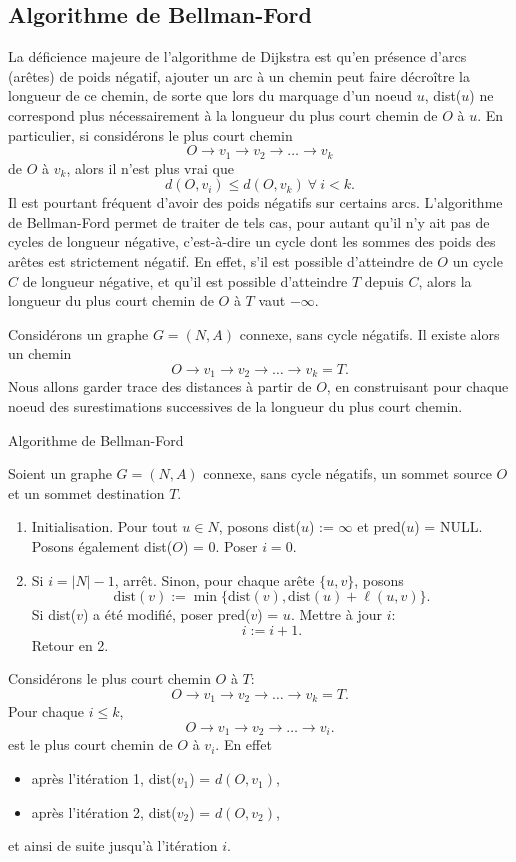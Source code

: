 \subsection{Algorithme de Bellman-Ford}

La déficience majeure de l'algorithme de Dijkstra est qu'en présence d'arcs (arêtes) de poids négatif, ajouter un arc à un chemin peut faire décroître la longueur de ce chemin, de sorte que lors du marquage d'un noeud $u$, dist($u$) ne correspond plus nécessairement à la longueur du plus court chemin de $O$ à $u$.
En particulier, si considérons le plus court chemin
\[
O \rightarrow v_1 \rightarrow v_2 \rightarrow \ldots \rightarrow v_k
\]
de $O$ à $v_k$, alors il n'est plus vrai que
\[
d(O,v_i) \leq d(O,v_k) \ \forall \ i < k.
\]
Il est pourtant fréquent d'avoir des poids négatifs sur certains arcs.
L'algorithme de Bellman-Ford permet de traiter de tels cas, pour autant qu'il n'y ait pas de cycles de longueur négative, c'est-à-dire un cycle dont les sommes des poids des arêtes est strictement négatif.
En effet, s'il est possible d'atteindre de $O$ un cycle $C$ de longueur négative, et qu'il est possible d'atteindre $T$ depuis $C$, alors la longueur du plus court chemin de $O$ à $T$ vaut $-\infty$.

Considérons un graphe $G=(N,A)$ connexe, sans cycle négatifs.
Il existe alors un chemin
\[
O \rightarrow v_1 \rightarrow v_2 \rightarrow \ldots \rightarrow v_k = T.
\]
Nous allons garder trace des distances à partir de $O$, en construisant pour chaque noeud des surestimations successives de la longueur du plus court chemin.
\begin{algo}{Algorithme de Bellman-Ford}

Soient un graphe $G=(N,A)$ connexe, sans cycle négatifs, un sommet source $O$ et un sommet destination $T$.
\begin{enumerate}
\item
Initialisation. Pour tout $u \in N$, posons dist($u$) := $\infty$ et pred($u$) = NULL.
Posons également dist($O$) = 0. Poser $i = 0$.
\item
Si $i = |N| - 1$, arrêt. Sinon, pour chaque arête $\lbrace u, v \rbrace$, posons
\[
\mbox{dist}(v) := \min \lbrace \mbox{dist}(v), \mbox{dist}(u) + \ell(u,v) \rbrace.
\]
Si dist($v$) a été modifié, poser pred($v$) = $u$.
Mettre à jour $i$:
\[
i := i+1.
\]
Retour en 2.
\end{enumerate}
\end{algo}
Considérons le plus court chemin $O$ à $T$:
\[
O \rightarrow v_1 \rightarrow v_2 \rightarrow \ldots \rightarrow v_k = T.
\]
Pour chaque $i \leq k$,
\[
O \rightarrow v_1 \rightarrow v_2 \rightarrow \ldots \rightarrow v_i.
\]
est le plus court chemin de $O$ à $v_i$. En effet
\begin{itemize}
\item
après l'itération 1, dist($v_1$) = $d(O,v_1)$,
\item
après l'itération 2, dist($v_2$) = $d(O,v_2)$,
\end{itemize}
et ainsi de suite jusqu'à l'itération $i$.

